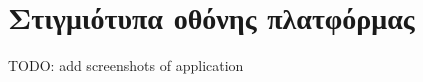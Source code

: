 \chapter{Στιγμιότυπα οθόνης πλατφόρμας} \label{screenshots-appendix}

TODO: add screenshots of application
